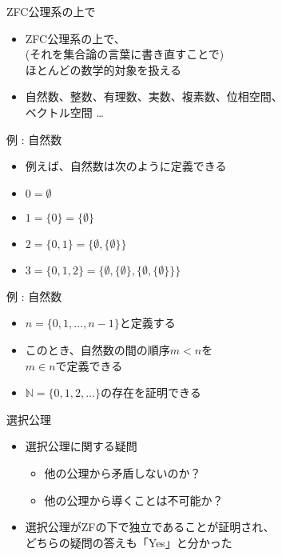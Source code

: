 \documentclass[17pt,aspectratio=169,xcolor=dvipsnames,table,dvipdfmx]{beamer}
\theoremstyle{definition}
\begin{document}
\begin{frame}{ZFC公理系の上で}
    \begin{itemize}

        \item ZFC公理系の上で、\\(それを集合論の言葉に書き直すことで)\\ ほとんどの数学的対象を扱える
        \item 自然数、整数、有理数、実数、複素数、位相空間、\\ ベクトル空間 \dots

    \end{itemize}
\end{frame}

\begin{frame}{例 : 自然数}
    \begin{itemize}
        \item 例えば、自然数は次のように定義できる
        \item $0 = \emptyset$
        \item $1 = \{0\} = \{\emptyset\}$
        \item $2 = \{0, 1\} = \{\emptyset, \{\emptyset\}\}$
        \item $3 = \{0, 1, 2\} = \{\emptyset, \{\emptyset\}, \{\emptyset, \{\emptyset\}\}\}$
    \end{itemize}
\end{frame}

\begin{frame} {例 : 自然数}
    \begin{itemize}
        \item $n = \{0, 1, \dots, n-1\}$と定義する
        \item このとき、自然数の間の順序$m < n$を\\$m \in n$で定義できる
        \item $\mathbb{N} = \{ 0, 1, 2, \dots \}$の存在を証明できる
    \end{itemize}
\end{frame}

\begin{frame} {選択公理}
    \begin{itemize}
        \item 選択公理に関する疑問
              \begin{itemize}
                  \item 他の公理から矛盾しないのか？
                  \item 他の公理から導くことは不可能か？
              \end{itemize}
        \item 選択公理がZFの下で独立であることが証明され、\\
              どちらの疑問の答えも「Yes」と分かった
    \end{itemize}
\end{frame}
\end{document}
